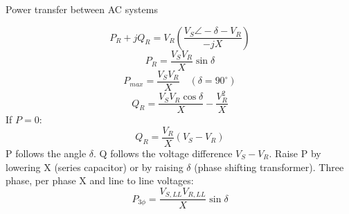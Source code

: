 Power transfer between AC systems

$$P_R+jQ_R=V_R\left(\frac{V_S\angle-\delta-V_R}{-jX}\right)$$
$$P_R=\frac{V_SV_R}{X}\sin\delta$$
$$P_{max}=\frac{V_SV_R}{X}\quad(\delta=90^{\circ})$$
$$Q_R=\frac{V_SV_R\cos\delta}{X}-\frac{V_R^2}{X}$$
If $P=0$:
$$Q_R=\frac{V_R}{X}\left(V_S-V_R\right)$$
P follows the angle $\delta$. Q follows the voltage difference $V_S-V_R$. Raise P by lowering X (series capacitor) or by raising $\delta$ (phase shifting transformer).
Three phase, per phase X and line to line voltages:
$$P_{3\phi}=\frac{V_{S,LL}V_{R,LL}}{X}\sin\delta$$
